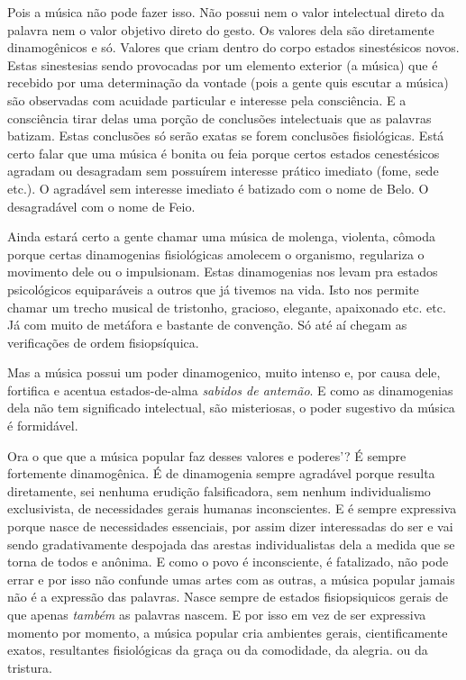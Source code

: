 Pois a música não pode fazer isso. Não possui nem o valor intelectual
direto da palavra nem o valor objetivo direto do gesto. Os valores dela
são diretamente dinamogênicos e só. Valores que criam dentro do corpo
estados sinestésicos novos. Estas sinestesias sendo provocadas por um
elemento exterior (a música) que é recebido por uma determinação da
vontade (pois a gente quis escutar a música) são observadas com acuidade
particular e interesse pela consciência. E a consciência tirar delas uma
porção de conclusões intelectuais que as palavras batizam. Estas
conclusões só serão exatas se forem conclusões fisiológicas. Está certo
falar que uma música é bonita ou feia porque certos estados cenestésicos
agradam ou desagradam sem possuírem interesse prático imediato (fome,
sede etc.). O agradável sem interesse imediato é batizado com o nome de
Belo. O desagradável com o nome de Feio.

Ainda estará certo a gente chamar uma música de molenga, violenta,
cômoda porque certas dinamogenias fisiológicas amolecem o organismo,
regulariza o movimento dele ou o impulsionam. Estas dinamogenias nos
levam pra estados psicológicos equiparáveis a outros que já tivemos na
vida. Isto nos permite chamar um trecho musical de tristonho, gracioso,
elegante, apaixonado etc. etc. Já com muito de metáfora e bastante de
convenção. Só até aí chegam as verificações de ordem fisiopsíquica.

Mas a música possui um poder dinamogenico, muito intenso e, por causa
dele, fortifica e acentua estados-de-alma \emph{sabidos de antemão}. E
como as dinamogenias dela não tem significado intelectual, são
misteriosas, o poder sugestivo da música é formidável.

Ora o que que a música popular faz desses valores e poderes'? É sempre
fortemente dinamogênica. É de dinamogenia sempre agradável porque
resulta diretamente, sei nenhuma erudição falsificadora, sem nenhum
individualismo exclusivista, de necessidades gerais humanas
inconscientes. E é sempre expressiva porque nasce de necessidades
essenciais, por assim dizer interessadas do ser e vai sendo
gradativamente despojada das arestas individualistas dela a medida que
se torna de todos e anônima. E como o povo é inconsciente, é fatalizado,
não pode errar e por isso não confunde umas artes com as outras, a
música popular jamais não é a expressão das palavras. Nasce sempre de
estados fisiopsiquicos gerais de que apenas \emph{também} as palavras
nascem. E por isso em vez de ser expressiva momento por momento, a
música popular cria ambientes gerais, cientificamente exatos,
resultantes fisiológicas da graça ou da comodidade, da alegria. ou da
tristura.

